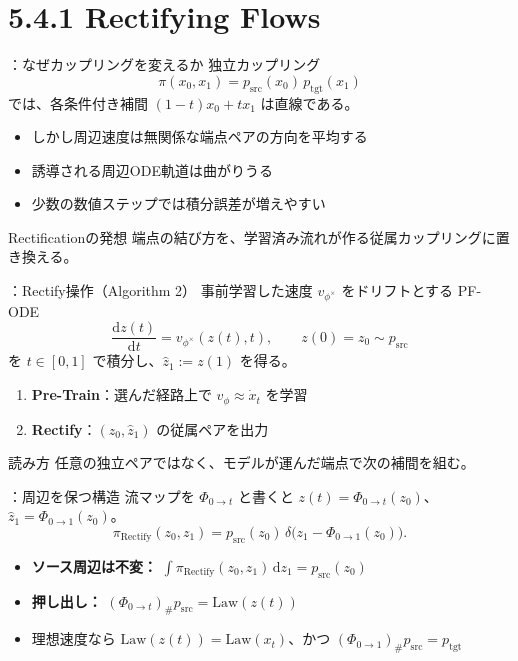 \section{5.4.1 Rectifying Flows}
\assuppl
\begin{frame}{\supplmark：なぜカップリングを変えるか}
    独立カップリング
    \[
        \pi(x_0,x_1)=p_{\mathrm{src}}(x_0)\,p_{\mathrm{tgt}}(x_1)
    \]
    では、各条件付き補間 $(1-t)x_0+tx_1$ は直線である。
    \begin{itemize}
        \item しかし周辺速度は無関係な端点ペアの方向を平均する
        \item 誘導される周辺ODE軌道は曲がりうる
        \item 少数の数値ステップでは積分誤差が増えやすい
    \end{itemize}
    \begin{alertblock}{Rectificationの発想}
        端点の結び方を、学習済み流れが作る従属カップリングに置き換える。
    \end{alertblock}
\end{frame}
\assuppl
\begin{frame}{\supplmark：Rectify操作（Algorithm 2）}
    事前学習した速度 $v_{\phi^\times}$ をドリフトとする PF-ODE
    \[
        \frac{\mathrm{d}z(t)}{\mathrm{d}t}
        = v_{\phi^\times}(z(t),t),
        \qquad
        z(0)=z_0\sim p_{\mathrm{src}}
    \]
    を $t\in[0,1]$ で積分し、$\hat{z}_1:=z(1)$ を得る。
    \begin{enumerate}
        \item \textbf{Pre-Train}：選んだ経路上で $v_\phi\approx \dot{x}_t$ を学習
        \item \textbf{Rectify}：$(z_0,\hat{z}_1)$ の従属ペアを出力
    \end{enumerate}
    \begin{exampleblock}{読み方}
        任意の独立ペアではなく、モデルが運んだ端点で次の補間を組む。
    \end{exampleblock}
\end{frame}
\assuppl
\begin{frame}{\supplmark：周辺を保つ構造}
    流マップを $\Phi_{0\to t}$ と書くと $z(t)=\Phi_{0\to t}(z_0)$、
    $\hat{z}_1=\Phi_{0\to 1}(z_0)$。
    \[
        \pi_{\mathrm{Rectify}}(z_0,z_1)
        =
        p_{\mathrm{src}}(z_0)\,
        \delta\!\bigl(z_1-\Phi_{0\to 1}(z_0)\bigr).
    \]
    \begin{itemize}
        \item \textbf{ソース周辺は不変：}
        $\int \pi_{\mathrm{Rectify}}(z_0,z_1)\,\mathrm{d}z_1=p_{\mathrm{src}}(z_0)$
        \item \textbf{押し出し：}
        $(\Phi_{0\to t})_{\#}p_{\mathrm{src}}=\mathrm{Law}(z(t))$
        \item 理想速度なら $\mathrm{Law}(z(t))=\mathrm{Law}(x_t)$、かつ
        $(\Phi_{0\to 1})_{\#}p_{\mathrm{src}}=p_{\mathrm{tgt}}$
    \end{itemize}
\end{frame}
